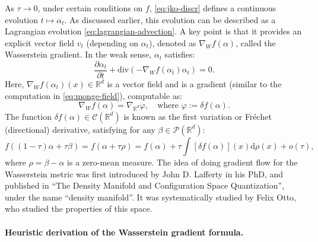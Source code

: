 As $\tau \to 0$, under certain conditions on $f$, \eqref{eq:jko-discr} defines a continuous evolution $t \mapsto \alpha_t$. As discussed earlier, this evolution can be described as a Lagrangian evolution \eqref{eq:lagrangian-advection}. A key point is that it provides an explicit vector field $v_t$ (depending on $\alpha_t$), denoted as $\nabla_W f(\alpha)$, called the Wasserstein gradient. In the weak sense, $\alpha_t$ satisfies:
\begin{equation}
    \frac{\partial \alpha_t}{\partial t} + \mathrm{div}(-\nabla_W f(\alpha_t) \alpha_t) = 0. \label{eq:wassflow-pde}
\end{equation}
Here, $\nabla_W f(\alpha_t)(x) \in \mathbb{R}^d$ is a vector field and is a gradient (similar to the computation in \eqref{eq:monge-field}), computable as:
\begin{equation*}
    \nabla_W f(\alpha) = \nabla_{\mathbb{R}^d} \varphi, \quad \text{where } \varphi := \delta f(\alpha).
\end{equation*}
The function $\delta f(\alpha) \in \mathcal{C}(\mathbb{R}^d)$ is known as the first variation or Fr\'echet (directional) derivative, satisfying for any $\beta \in \mathcal{P}(\mathbb{R}^d)$:
\begin{equation*}
    f((1-\tau)\alpha + \tau \beta) = f(\alpha + \tau \rho) = f(\alpha) + \tau \int [\delta f(\alpha)](x) \mathrm{d} \rho(x) + o(\tau),
\end{equation*}
where $\rho = \beta - \alpha$ is a zero-mean measure.
%
The idea of doing gradient flow for the Wasserstein metric was first introduced by John D. Lafferty in his PhD, and published in ``The Density Manifold and Configuration Space Quantization'', under the name ``density manifold''. It was systematically studied by Felix Otto, who studied the properties of this space.

\paragraph{Heuristic derivation of the Wasserstein gradient formula.}

